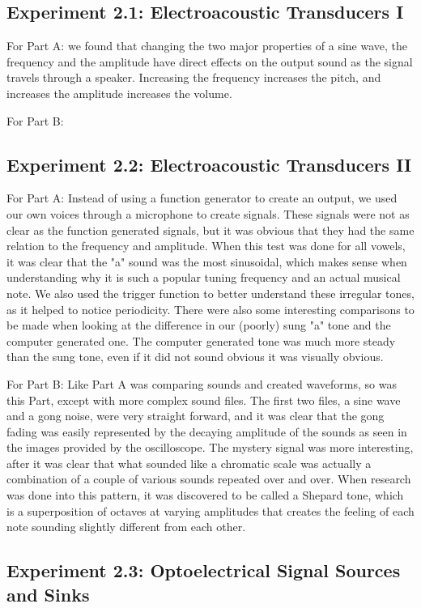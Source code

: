 \documentclass[10pt]{article}
\begin{document}
\subsection{Experiment 2.1: Electroacoustic Transducers I}
\qquad For Part A: we found that changing the two major properties of a sine wave, the frequency and the amplitude have direct effects on the output sound as the signal travels through a speaker. Increasing the frequency increases the pitch, and increases the amplitude increases the volume.

For Part B: 

\subsection{Experiment 2.2: Electroacoustic Transducers II}
For Part A: Instead of using a function generator to create an output, we used our own voices through a microphone to create signals. These signals were not as clear as the function generated signals, but it was obvious that they had the same relation to the frequency and amplitude. When this test was done for all vowels, it was clear that the "a" sound was the most sinusoidal, which makes sense when understanding why it is such a popular tuning frequency and an actual musical note. We also used the trigger function to better understand these irregular tones, as it helped to notice periodicity. There were also some interesting comparisons to be made when looking at the difference in our (poorly) sung "a" tone and the computer generated one. The computer generated tone was much more steady than the sung tone, even if it did not sound obvious it was visually obvious. 

For Part B: Like Part A was comparing sounds and created waveforms, so was this Part, except with more complex sound files. The first two files, a sine wave and a gong noise, were very straight forward, and it was clear that the gong fading was easily represented by the decaying amplitude of the sounds as seen in the images provided by the oscilloscope. The mystery signal was more interesting, after it was clear that what sounded like a chromatic scale was actually a combination of a couple of various sounds repeated over and over. When research was done into this pattern, it was discovered to be called a Shepard tone, which is a superposition of octaves at varying amplitudes that creates the feeling of each note sounding slightly different from each other.

\subsection{Experiment 2.3: Optoelectrical Signal Sources and Sinks}
\end{document}
